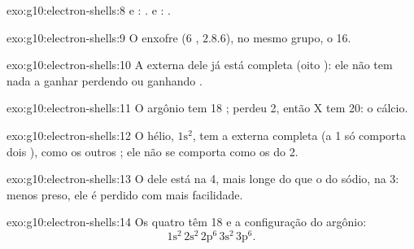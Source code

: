 \begin{solution}{exo:g10:electron-shells:8}
 e : .  e :
.
\end{solution}

\begin{solution}{exo:g10:electron-shells:9}
O enxofre (6 , $2.8.6$), no mesmo grupo, o 16.
\end{solution}

\begin{solution}{exo:g10:electron-shells:10}
A  externa dele já está completa (oito ): ele não tem
nada a ganhar perdendo ou ganhando .
\end{solution}

\begin{solution}{exo:g10:electron-shells:11}
O argônio tem 18 ;  perdeu 2, então X tem 20: o cálcio.
\end{solution}

\begin{solution}{exo:g10:electron-shells:12}
O hélio, $1\mathrm{s}^2$, tem a  externa completa (a  1 só
comporta dois ), como os outros ; ele não se
comporta como os  do  2.
\end{solution}

\begin{solution}{exo:g10:electron-shells:13}
O  dele está na  4, mais longe do  que o
do sódio, na  3: menos preso, ele é perdido com mais facilidade.
\end{solution}

\begin{solution}{exo:g10:electron-shells:14}
Os quatro têm 18  e a configuração do argônio:
\[ 1\mathrm{s}^2\,2\mathrm{s}^2\,2\mathrm{p}^6\,3\mathrm{s}^2\,3\mathrm{p}^6. \]
\end{solution}

